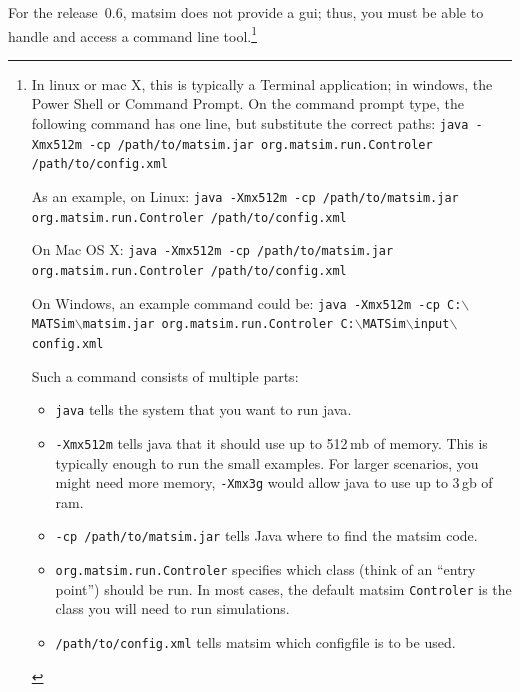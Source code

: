 For the release~0.6, \gls{matsim} does not provide a \gls{gui}; thus, you must be able to handle and access a command line tool.\footnote{%
%
\baselineskip
\parindent0pt
%
In \gls{linux} or \gls{mac} X, this is typically a Terminal application; in \gls{windows}, the Power Shell or Command Prompt.
%
On the command prompt type, the following command has one line, but substitute the correct paths: 
\lstinline|java -Xmx512m -cp /path/to/matsim.jar org.matsim.run.Controler /path/to/config.xml|

As an example, on Linux: 
\lstinline|java -Xmx512m -cp /path/to/matsim.jar org.matsim.run.Controler /path/to/config.xml|

On Mac OS X: 
\lstinline|java -Xmx512m -cp /path/to/matsim.jar org.matsim.run.Controler /path/to/config.xml|

On Windows, an example command could be: 
\lstinline{java -Xmx512m -cp C:}$\backslash$\lstinline{MATSim}$\backslash$\lstinline{matsim.jar org.matsim.run.Controler C:}$\backslash$\lstinline{MATSim}$\backslash$\lstinline{input}$\backslash$\lstinline{config.xml}

Such a command consists of multiple parts:
\begin{itemize}\styleItemize
\item \lstinline|java| tells the system that you want to run \gls{java}.
\item \lstinline|-Xmx512m| tells \gls{java} that it should use up to 512\,\gls{mb} of memory. This is typically enough to run the small examples. For larger \glspl{scenario}, you might need more memory, \eg \lstinline|-Xmx3g| would allow \gls{java} to use up to 3\,\gls{gb} of \gls{ram}.
\item \lstinline|-cp /path/to/matsim.jar| tells Java where to find the \gls{matsim} code.
\item \lstinline|org.matsim.run.Controler| specifies which class (think of an ``entry point'') should be run. In most cases, the default \gls{matsim} \lstinline|Controler| is the class you will need to run simulations.
\item \lstinline|/path/to/config.xml| tells \gls{matsim} which \gls{configfile} is to be used. 
\end{itemize}
}

